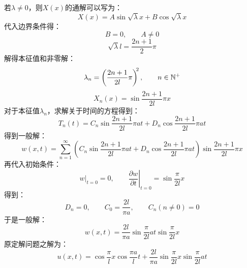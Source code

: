 \documentclass[fontset=windows]{ctexart}
\begin{document}
\begin{itemize}
    若$\lambda \neq 0$，则$X(x)$的通解可以写为：
    \[
    X(x) = A\sin\sqrt\lambda x + B\cos\sqrt\lambda x
    \]
    代入边界条件得：
    \[
    B = 0,\qquad
    A \neq 0
    \]
    \[
    \sqrt{\lambda}l = \frac{2n+1}{2}\pi
    \]
    解得本征值和非零解：
    \[
    \lambda_n = \left(\frac{2n+1}{2l}\pi\right)^{\hspace{-0.25em}2},\qquad
    n\in\mathbb{N^+}
    \]
    \[
    X_n(x) = \sin\frac{2n+1}{2l}\pi x
    \]
    对于本征值$\lambda_n$，求解关于时间的方程得到：
    \[
    T_n(t) = C_n\sin\frac{2n+1}{2l}\pi at + D_n\cos\frac{2n+1}{2l}\pi at
    \]
    得到一般解：
    \[
    w(x,t) = \sum_{n = 1}^{\infty}\left(C_n\sin\frac{2n+1}{2l}\pi at + D_n\cos\frac{2n+1}{2l}\pi at\right)\sin\frac{2n+1}{2l}\pi x
    \]
    再代入初始条件：
    \[
    \left.w\right|_{t=0} = 0,\qquad
    \left.\frac{\partial w}{\partial t}\right|_{t=0} = \sin\frac{\pi}{2l}x
    \]
    得到：
    \[
    D_n = 0,\qquad
    C_0 = \frac{2l}{\pi a},\qquad
    C_n(n \neq 0) = 0
    \]
    于是一般解：
    \[
    w(x,t) = \frac{2l}{\pi a}\sin\frac{\pi}{2l}at\sin\frac{\pi}{2l}x
    \]
    原定解问题之解为：
    \[
    u(x,t) = \cos\frac{\pi}{l}x\cos\frac{\pi a}{l}t + \frac{2l}{\pi a}\sin\frac{\pi}{2l}x\sin\frac{\pi}{2l}at
    \]
    \bigskip


\end{itemize}
\end{document}
